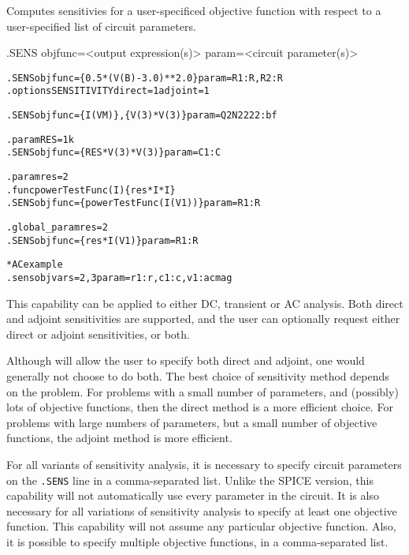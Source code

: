 


 
Computes sensitivies for a user-specificed objective function
with respect to a user-specified list of circuit parameters.  


\begin{Command}

\format
.SENS objfunc=<output expression(s)> param=<circuit parameter(s)>  

\examples
\begin{alltt}
.SENS objfunc=\{0.5*(V(B)-3.0)**2.0\} param=R1:R,R2:R
.options SENSITIVITY direct=1 adjoint=1

.SENS objfunc=\{I(VM)\},\{V(3)*V(3)\} param= Q2N2222:bf

.param RES=1k
.SENS objfunc=\{RES*V(3)*V(3)\} param=C1:C

.param res=2
.func powerTestFunc(I) \{res*I*I\}
.SENS objfunc=\{powerTestFunc(I(V1))\} param=R1:R

.global\_param res=2
.SENS objfunc=\{res*I(V1)\} param=R1:R

* AC example
.sens objvars=2,3 param=r1:r,c1:c,v1:acmag
\end{alltt}

\comments

This capability can be applied to either DC, transient or AC analysis.  
Both direct and adjoint sensitivities are supported, 
and the user can optionally request either direct or adjoint sensitivities, 
or both.  

Although \Xyce{} will allow the user to specify both direct and 
adjoint, one would generally not choose to do both.
The best choice of sensitivity method depends on the problem.  For problems 
with a small number of parameters, and (possibly) lots of objective functions, 
then the direct method is a more efficient choice.  For problems with large 
numbers of parameters, but a small number of objective functions, the 
adjoint method is more efficient.

For all variants of sensitivity analysis, it is necessary to specify 
circuit parameters on the \texttt{.SENS} line in a comma-separated list.  Unlike the SPICE version, 
this capability will not automatically use every parameter in the circuit.
It is also necessary for all variations of sensitivity analysis to specify at least 
one objective function.  This capability will not assume any particular 
objective function.  Also, it is possible to specify multiple
objective functions, in a comma-separated list.


\end{Command}
